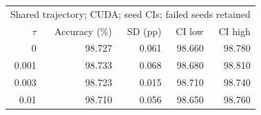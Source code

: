 \begin{tabular}{rrrrr}
\toprule
\multicolumn{5}{l}{Shared trajectory; CUDA; seed CIs; failed seeds retained} \\
$\tau$ & Accuracy (\%) & SD (pp) & CI low & CI high \\
\midrule
0 & 98.727 & 0.061 & 98.660 & 98.780 \\
0.001 & 98.733 & 0.068 & 98.680 & 98.810 \\
0.003 & 98.723 & 0.015 & 98.710 & 98.740 \\
0.01 & 98.710 & 0.056 & 98.650 & 98.760 \\
\bottomrule
\end{tabular}
